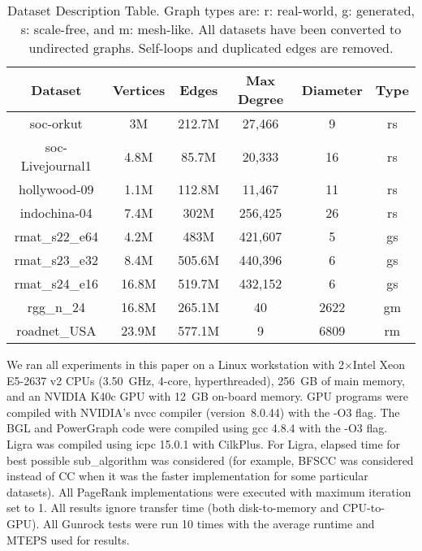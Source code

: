 \documentclass[format=acmsmall,review=false,screen=true]{acmart}
\begin{document}
\begin{table}
  \small
  \centering
  \setlength{\tabcolsep}{3pt}
  \begin{tabular}{*{6}{c}} \toprule Dataset &Vertices&Edges&Max Degree& Diameter& Type \\
    \midrule
    soc-orkut & 3M & 212.7M & 27,466 & 9 & rs
    \\ soc-Livejournal1 & 4.8M & 85.7M & 20,333 & 16 & rs
    \\ hollywood-09 & 1.1M & 112.8M & 11,467 & 11 & rs
    \\ indochina-04 & 7.4M & 302M & 256,425 & 26 & rs
    \\ rmat\_s22\_e64 & 4.2M & 483M & 421,607 & 5 & gs
    \\ rmat\_s23\_e32 & 8.4M & 505.6M & 440,396 & 6 & gs
    \\ rmat\_s24\_e16 & 16.8M & 519.7M & 432,152 & 6 & gs
    \\ rgg\_n\_24 & 16.8M & 265.1M & 40 & 2622 & gm
    \\ roadnet\_USA & 23.9M & 577.1M & 9 & 6809 & rm
    \\ \bottomrule
  \end{tabular}
  \caption[Dataset description table.]{Dataset Description Table.
    Graph types are: r: real-world, g: generated, s: scale-free, and
    m: mesh-like. All datasets have been converted to undirected
    graphs. Self-loops and duplicated edges are
    removed.\label{tab:dataset}}
\end{table}

We ran all experiments in this paper on a Linux workstation with
2$\times$Intel Xeon E5-2637 v2 CPUs (3.50~GHz, 4-core, hyperthreaded),
256~GB of main memory, and an NVIDIA K40c GPU with 12~GB on-board
memory. GPU programs were compiled with NVIDIA's nvcc compiler
(version~8.0.44) with the -O3 flag. The BGL and PowerGraph code were
compiled using gcc 4.8.4 with the -O3 flag. Ligra was compiled using
icpc 15.0.1 with CilkPlus. For Ligra, elapsed time for best possible
sub\_algorithm was considered (for example, BFSCC was considered instead
of CC when it was the faster implementation for some particular datasets).
All PageRank implementations were executed with maximum iteration set
to 1. All results ignore transfer time (both disk-to-memory and
CPU-to-GPU)\@. All Gunrock tests were run 10 times with the average
runtime and MTEPS used for results.
\end{document}
